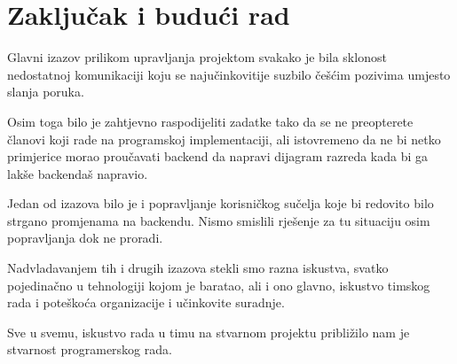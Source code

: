 \chapter{Zaključak i budući rad}
		
		Glavni izazov prilikom upravljanja projektom svakako je bila sklonost nedostatnoj komunikaciji koju se najučinkovitije suzbilo češćim pozivima umjesto slanja poruka.
		
		Osim toga bilo je zahtjevno raspodijeliti zadatke tako da se ne preopterete članovi koji rade na programskoj implementaciji, ali istovremeno da ne bi netko primjerice morao proučavati backend da napravi dijagram razreda kada bi ga lakše backendaš napravio.
		
		Jedan od izazova bilo je i popravljanje korisničkog sučelja koje bi redovito bilo strgano promjenama na backendu. Nismo smislili rješenje za tu situaciju osim popravljanja dok ne proradi.
		
		Nadvladavanjem tih i drugih izazova stekli smo razna iskustva, svatko pojedinačno u tehnologiji kojom je baratao, ali i ono glavno, iskustvo timskog rada i poteškoća organizacije i učinkovite suradnje.
		
		Sve u svemu, iskustvo rada u timu na stvarnom projektu približilo nam je stvarnost programerskog rada.
		
		\eject 
